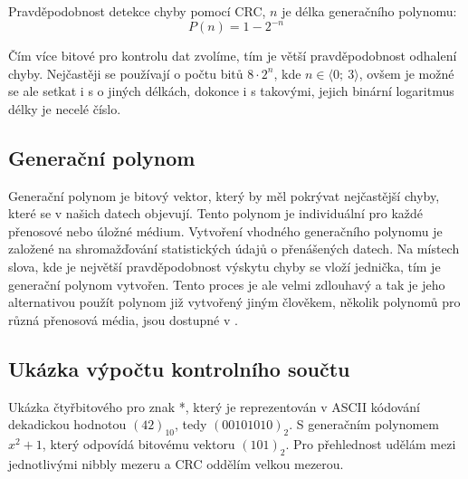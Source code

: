 Pravděpodobnost detekce chyby pomocí CRC, $n$ je délka generačního polynomu:
\begin{equation}
    P(n) = 1 - 2^{-n} \nonumber
\end{equation}

Čím více bitové  pro kontrolu dat zvolíme, tím je větší pravděpodobnost odhalení chyby. Nejčastěji se používají  o počtu bitů $8 \cdot 2^n$, kde $n \in \langle 0;~3\rangle$, ovšem je možné se ale setkat i s  o jiných délkách, dokonce i s takovými, jejich binární logaritmus délky je necelé číslo.



\subsection{Generační polynom}
Generační polynom je bitový vektor, který by měl pokrývat nejčastější chyby, které se v našich datech objevují. Tento polynom je individuální pro každé přenosové nebo úložné médium. Vytvoření vhodného generačního polynomu je založené na shromažďování statistických údajů o přenášených datech. Na místech slova, kde je největší pravděpodobnost výskytu chyby se vloží jednička, tím je generační polynom vytvořen. Tento proces je ale velmi zdlouhavý a tak je jeho alternativou použít polynom již vytvořený jiným člověkem, několik polynomů pro různá přenosová média, jsou dostupné v \cite{crc-wiki}.

\subsection{Ukázka výpočtu kontrolního součtu}

Ukázka čtyřbitového  pro znak *, který je reprezentován v ASCII kódování dekadickou hodnotou $(42)_{10}$, tedy $(00101010)_2$. S generačním polynomem $x^2+1$, který odpovídá bitovému vektoru $(101)_2$. Pro přehlednost udělám mezi jednotlivými nibbly mezeru a CRC oddělím velkou mezerou.

